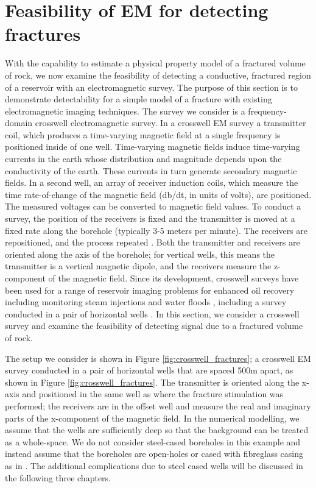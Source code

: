 \section{Feasibility of EM for detecting fractures}
With the capability to estimate a physical property model of a fractured volume of rock, we now examine the feasibility of detecting a conductive, fractured region of a reservoir with an electromagnetic survey. The purpose of this section is to demonstrate detectability for a simple model of a fracture with existing electromagnetic imaging techniques. The survey we consider is a frequency-domain crosswell electromagnetic survey. In a crosswell EM survey a transmitter coil, which produces a time-varying magnetic field at a single frequency is positioned inside of one well. Time-varying magnetic fields induce time-varying currents in the earth whose distribution and magnitude depends upon the conductivity of the earth. These currents in turn generate secondary magnetic fields. In a second well, an array of receiver induction coils, which measure the time rate-of-change of the magnetic field (db/dt, in units of volts), are positioned. The measured voltages can be converted to magnetic field values. To conduct a survey, the position of the receivers is fixed and the transmitter is moved at a fixed rate along the borehole (typically 3-5 meters per minute). The receivers are repositioned, and the process repeated \citep{Wilt1995}. Both the transmitter and receivers are oriented along the axis of the borehole; for vertical wells, this means the transmitter is a vertical magnetic dipole, and the receivers measure the z-component of the magnetic field. Since its development, crosswell surveys have been used for a range of reservoir imaging problems for enhanced oil recovery including monitoring steam injections \citep{Wilt1997} and water floods \citep{Wilt2012}, including a survey conducted in a pair of horizontal wells \citep{Marsala2015, Marsala2015a}. In this section, we consider a crosswell survey and examine the feasibility of detecting signal due to a fractured volume of rock.

The setup we consider is shown in Figure \ref{fig:crosswell_fractures}; a crosswell EM survey conducted in a pair of horizontal wells that are spaced 500m apart, as shown in Figure \ref{fig:crosswell_fractures}. The transmitter is oriented along the x-axis and positioned in the same well as where the fracture stimulation was performed; the receivers are in the offset well and measure the real and imaginary parts of the x-component of the magnetic field. In the numerical modelling, we assume that the wells are sufficiently deep so that the background can be treated as a whole-space. We do not consider steel-cased boreholes in this example and instead assume that the boreholes are open-holes or cased with fibreglass casing as in \cite{Wilt2012}. The additional complications due to steel cased wells will be discussed in the following three chapters.

